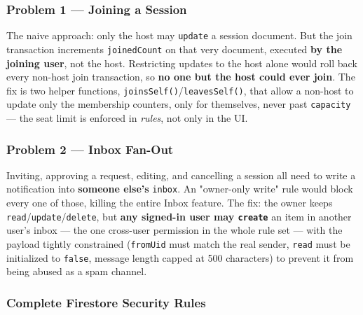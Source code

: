 \subsubsection{Problem 1 --- Joining a Session}

The naive approach: only the host may \texttt{update} a session document. But the join transaction increments \texttt{joinedCount} on that very document, executed \textbf{by the joining user}, not the host. Restricting updates to the host alone would roll back every non-host join transaction, so \textbf{no one but the host could ever join}. The fix is two helper functions, \texttt{joinsSelf()}/\texttt{leavesSelf()}, that allow a non-host to update only the membership counters, only for themselves, never past \texttt{capacity} — the seat limit is enforced in \emph{rules}, not only in the UI.

\subsubsection{Problem 2 --- Inbox Fan-Out}

Inviting, approving a request, editing, and cancelling a session all need to write a notification into \textbf{someone else's} \texttt{inbox}. An "owner-only write" rule would block every one of those, killing the entire Inbox feature. The fix: the owner keeps \texttt{read}/\texttt{update}/\texttt{delete}, but \textbf{any signed-in user may \texttt{create}} an item in another user's inbox — the one cross-user permission in the whole rule set — with the payload tightly constrained (\texttt{fromUid} must match the real sender, \texttt{read} must be initialized to \texttt{false}, message length capped at 500 characters) to prevent it from being abused as a spam channel.

\subsubsection{Complete Firestore Security Rules}

